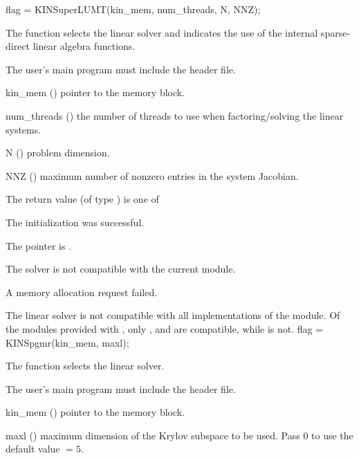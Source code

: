 {
  flag = KINSuperLUMT(kin\_mem, num\_threads, N, NNZ);
}
{
  The function  selects the {\kinsuperlumt} linear solver and indicates
  the use of the internal sparse-direct linear algebra functions.

  The user's main program must include the  header file.
}
{
  \begin{args}
  \item[kin\_mem] ()
    pointer to the {\kinsol} memory block.
  \item[num\_threads] ()
    the number of threads to use when factoring/solving the linear systems.
  \item[N] ()
    problem dimension.
  \item[NNZ] ()
    maximum number of nonzero entries in the system Jacobian.
  \end{args}
}
{
  The return value  (of type ) is one of
  \begin{args}
  \item[\Id{KINSLS\_SUCCESS}] 
    The {\kinsuperlumt} initialization was successful.
  \item[\Id{KINSLS\_MEM\_NULL}]
    The  pointer is .
  \item[\Id{KINSLS\_ILL\_INPUT}]
    The {\kinsuperlumt} solver is not compatible with the current {\nvector} module.
  \item[\Id{KINSLS\_MEM\_FAIL}]
    A memory allocation request failed.
  \end{args}
}
{
  The {\kinsuperlumt} linear solver is not compatible with all
  implementations of the {\nvector} module.  Of the {\nvector} modules
  provided with {\sundials}, only {\nvecs}, {\nvecopenmp} and
  {\nvecpthreads} are compatible, while {\nvecp} is not.
}
{
  flag = KINSpgmr(kin\_mem, maxl);
}
{
  The function  selects the {\kinspgmr} linear solver.

  The user's main program must include the  header file.
}
{
  \begin{args}
  \item[kin\_mem] ()
    pointer to the {\kinsol} memory block.
  \item[maxl] ()
    maximum dimension of the Krylov subspace to be used. Pass $0$ to use the 
    default value $=5$.
  \end{args}
}
